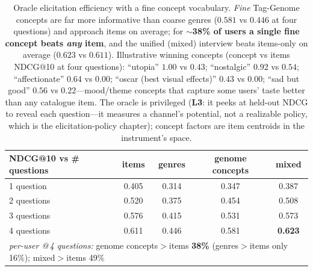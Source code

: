 \documentclass[11pt]{article}
\begin{document}
\begin{table}[h]\centering\small
\begin{tabular}{lcccc}
\toprule
NDCG@10 vs \# questions & items & genres & genome concepts & mixed\\
\midrule
1 question & 0.405 & 0.314 & 0.347 & 0.387\\
2 questions & 0.520 & 0.375 & 0.454 & 0.508\\
3 questions & 0.576 & 0.415 & 0.531 & 0.573\\
4 questions & 0.611 & 0.446 & 0.581 & \textbf{0.623}\\
\midrule
\multicolumn{5}{l}{\emph{per-user @\,4 questions:} genome concepts$>$items \textbf{38\%} (genres$>$items only 16\%); mixed$>$items 49\%}\\
\bottomrule
\end{tabular}
\caption{Oracle elicitation efficiency with a fine concept vocabulary. \emph{Fine} Tag-Genome concepts are far more
informative than coarse genres ($0.581$ vs $0.446$ at four questions) and approach items on average; for
$\sim$\textbf{38\% of users a single fine concept beats \emph{any} item}, and the unified (mixed) interview beats
items-only on average ($0.623$ vs $0.611$). Illustrative winning concepts (concept vs items NDCG@10 at four
questions): ``utopia'' $1.00$ vs $0.43$; ``nostalgic'' $0.92$ vs $0.54$; ``affectionate'' $0.64$ vs $0.00$;
``oscar (best visual effects)'' $0.43$ vs $0.00$; ``sad but good'' $0.56$ vs $0.22$---mood/theme concepts that
capture some users' taste better than any catalogue item. The oracle is privileged (\textbf{L3}: it peeks at held-out
NDCG to reveal each question---it measures a channel's potential, not a realizable policy, which is the
elicitation-policy chapter); concept factors are item centroids in the instrument's space.}
\label{tab:eff}
\end{table}
\end{document}
